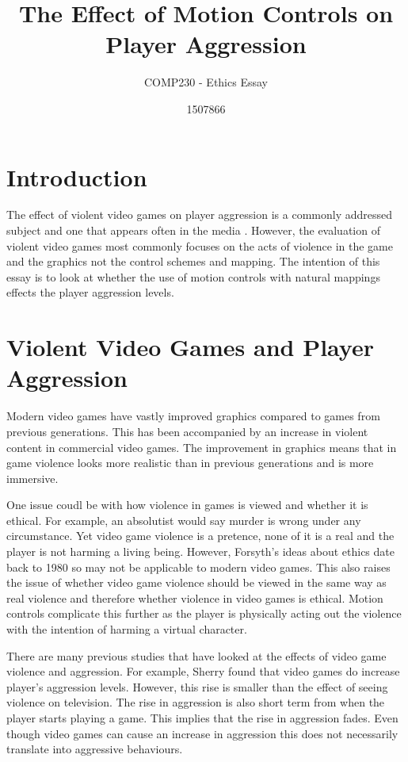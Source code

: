 \documentclass{scrartcl}
\title{The Effect of Motion Controls on Player Aggression }
\subtitle{COMP230 - Ethics Essay}
\author{1507866}
\begin{document}
	
\maketitle
	
	
\section{Introduction}
The effect of violent video games on player aggression is a commonly addressed subject and one that appears often in the media \cite{DailyMail, GuardianAggression, CBSNews}.
However, the evaluation of violent video games most commonly focuses on the acts of violence in the game and the graphics not the control schemes and mapping.  The intention of this essay is to look at whether the use of motion controls with natural mappings effects the player aggression levels.

\section{Violent Video Games and Player Aggression}
 
Modern video games have vastly improved graphics compared to games from previous generations.  \cite{Fumhe}  This has been accompanied by an increase in violent content in commercial video games. \cite{Fumhe} The improvement in graphics means that in game violence looks more realistic than in previous generations and is more immersive. \cite{Kim}

\bigskip
One issue coudl be with how violence in games is viewed and whether it is ethical. For example, an absolutist would say murder is wrong under any circumstance. \cite{forsyth} 
Yet video game violence is a pretence, none of it is a real and the player is not harming a living being. \cite{Tavinor}
However, Forsyth's ideas about ethics date back to 1980 so may not be applicable to modern video games. 
This also raises the issue of whether video game violence should be viewed in the same way as real violence and therefore whether violence in video games is ethical. Motion controls complicate this further as the player is physically acting out the violence with the intention of harming a virtual character. 

\bigskip
There are many previous studies that have looked at the effects of video game violence and aggression. For example, Sherry found that video games do increase player's aggression levels. However, this rise is smaller than the effect of seeing violence on television.  \cite{sherry2001effects}
The rise in aggression is also short term from when the player starts playing a game. This implies that the rise in aggression fades. Even though video games can cause an increase in aggression this does not necessarily translate into aggressive behaviours.  \cite{Ferguson}  
\end{document}
